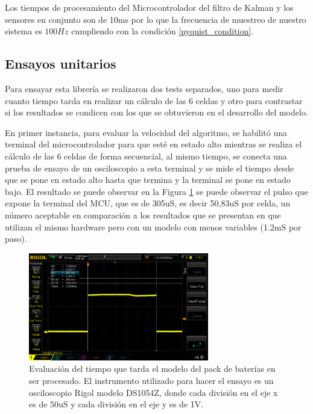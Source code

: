 \documentclass[10pt, a4paper]{report}
\begin{document}
Los tiempos de procesamiento del Microcontrolador del filtro de Kalman y los
sensores en conjunto son de 10ms por lo que la frecuencia de muestreo de nuestro
sistema es $100 Hz$ cumpliendo con la condición \ref{nyquist_condition}.

\subsection{Ensayos unitarios}

Para ensayar esta librer\'ia se realizaron dos tests separados, uno para medir
cuanto tiempo tarda en realizar un c\'alculo de las 6 celdas y otro para
contrastar si los resultados se condicen con los que se obtuvieron en el
desarrollo del modelo.

En primer instancia, para evaluar la velocidad del algoritmo, se habilit\'o una
terminal del microcontrolador para que est\'e en estado alto mientras se realiza
el c\'alculo de las 6 celdas de forma secuencial, al mismo tiempo, se conecta
una prueba de ensayo de un osciloscopio a esta terminal y se mide el tiempo
desde que se pone en estado alto hasta que termina y la terminal se pone en
estado bajo. El resultado se puede observar en la Figura \ref{fig:kalman_time} se
puede observar el pulso que expone la terminal del \acrshort{MCU}, que es de
305uS, es decir 50,83uS por celda, un n\'umero aceptable en comparaci\'on a los
resultados que se presentan en \cite{kalman_filter_embedded} que utilizan el
mismo hardware pero con un modelo con menos variables (1.2mS por paso).

\begin{figure}[h!]
    \begin{center}
        \includegraphics[width=0.7\textwidth]{kalman_time.png}
        \caption{Evaluaci\'on del tiempo que tarda el modelo del pack de
        bater\'ias en ser procesado. El instrumento utilizado para hacer el
        ensayo es un osciloscopio Rigol modelo DS1054Z, donde cada divisi\'on en
        el eje x es de 50uS y cada divisi\'on en el eje y es de 1V.}
        \label{fig:kalman_time}
    \end{center}
\end{figure}
\FloatBarrier
\end{document}
